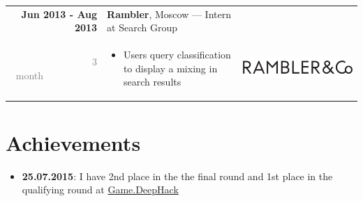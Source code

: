 \documentclass[a4paper,10pt]{article} %
\begin{document}
\begin{tabular}{r|p{11.5cm}c}
\textbf{Jun 2013 - Aug 2013} & \textbf{Rambler}, Moscow --- Intern at Search Group \\ 
\textcolor{gray}{3 month}~~~~~~~~~~~& 
\footnotesize{

\vspace{-0.25cm}
\begin{itemize}
	\item Users query classification to display a mixing in search results
\end{itemize}
\vspace{-0.3cm}
}
& \multirow{2}{*}{\includegraphics[scale=0.12]{img/ramblerco}}\\
\end{tabular}

\section{Achievements}

\begin{itemize}
    \item \textbf{25.07.2015}: I have 2nd place in the the final round and 1st place in the qualifying round at \href{http://game.deephack.me/}{Game.DeepHack}
\end{itemize}
\end{document}
